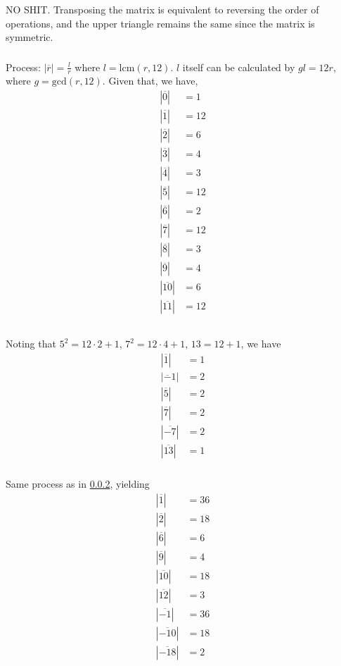 \documentclass{article}
\newcommand{\abs}[1]{| #1 |}
\renewcommand{\bar}{\overline}
\begin{document}
\subsubsection{}
NO SHIT. Transposing the matrix is equivalent to reversing the order of operations, and the upper triangle remains the same since the matrix is symmetric.
\subsubsection{}\label{ex11}
Process: $|\bar r| = \frac{l}{r}$ where $l = \mbox{lcm}(r,12)$. $l$ itself can be calculated by $gl = 12r$, where $g=\mbox{gcd}(r,12)$. Given that, we have,
\begin{align*}
\abs{\bar 0 } &= 1\\
\abs{\bar 1 } &= 12\\
\abs{\bar 2 } &= 6\\
\abs{\bar 3 } &= 4\\
\abs{\bar 4 } &= 3\\
\abs{\bar 5 } &= 12\\
\abs{\bar 6 } &= 2\\
\abs{\bar 7 } &= 12\\
\abs{\bar 8 } &= 3\\
\abs{\bar 9 } &= 4\\
\abs{\bar{10} } &= 6\\
\abs{\bar{11} } &= 12\\
\end{align*}
\subsubsection{}
Noting that $5^2 = 12\cdot 2 + 1$, $7^2 = 12\cdot 4+1$, $13 = 12+1$, we have
\begin{align*}
\abs{\bar 1 } &= 1\\
\abs{\bar -1 } &= 2\\
\abs{\bar 5 } &= 2\\
\abs{\bar 7 } &= 2\\
\abs{\bar{-7} } &= 2\\
\abs{\bar{13}} &= 1
\end{align*}
\subsubsection{}\label{ex13}
Same process as in \ref{ex11}, yielding
\begin{align*}
\abs{\bar 1 } &= 36\\
\abs{\bar 2 } &= 18\\
\abs{\bar 6 } &= 6\\
\abs{\bar 9 } &= 4\\
\abs{\bar{10}} &= 18\\
\abs{\bar{12} } &= 3\\
\abs{\bar{ -1} } &= 36\\
\abs{\bar{ -10 }} &= 18\\
\abs{\bar{-18 }} &= 2\\
\end{align*}
\end{document}
